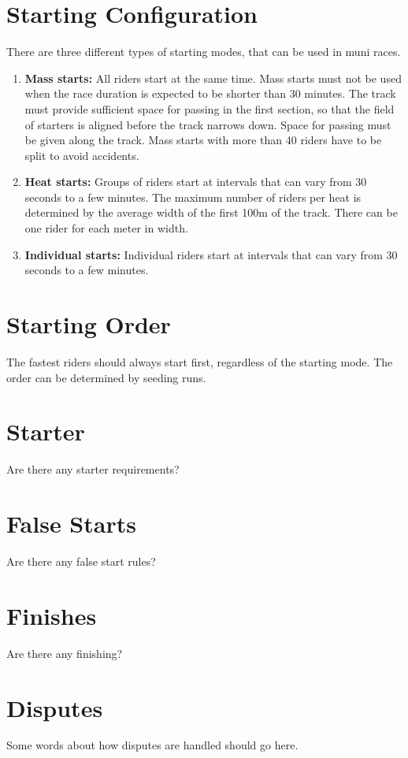 \section{Starting Configuration}

There are three different types of starting modes, that can be used in muni races.
\begin{enumerate}
\item \textbf{Mass starts:} All riders start at the same time.
Mass starts must not be used when the race duration is expected to be shorter than 30 minutes.
The track must provide sufficient space for passing in the first section, so that the field of starters is aligned before the track narrows down.
Space for passing must be given along the track.
Mass starts with more than 40 riders have to be split to avoid accidents.
\item \textbf{Heat starts:} Groups of riders start at intervals that can vary from 30 seconds to a few minutes.
The maximum number of riders per heat is determined by the average width of the first 100m of the track.
There can be one rider for each meter in width.
\item \textbf{Individual starts:} Individual riders start at intervals that can vary from 30 seconds to a few minutes.
\end{enumerate}

\section{Starting Order}

The fastest riders should always start first, regardless of the starting mode.
The order can be determined by seeding runs.


\section{Starter}

\begin{framed}
Are there any starter requirements?
\end{framed}

\section{False Starts}

\begin{framed}
Are there any false start rules?
\end{framed}

\section{Finishes}

\begin{framed}
Are there any finishing?
\end{framed}

\section{Disputes}

\begin{framed}
Some words about how disputes are handled should go here.
\end{framed}

